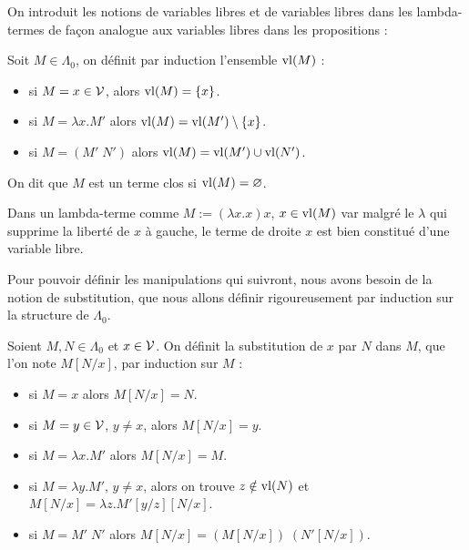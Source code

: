 On introduit les notions de variables libres et de variables libres dans les lambda-termes de façon analogue aux variables libres dans les propositions :

\begin{defi}
    Soit $M\in\Lambda_0$, on définit par induction l'ensemble $\mathrm{vl}(M)$ :
    \begin{itemize}[label=$\bullet$]
        \item si $M = x \in \mathcal V$, alors $\mathrm{vl}(M) = \{x\}$.
        \item si $M = \lambda x.M'$ alors $\mathrm{vl}(M) = \mathrm{vl}(M')\setminus \{x\}$.
        \item si $M = (M'\;N')$ alors $\mathrm{vl}(M) = \mathrm{vl}(M')\cup \mathrm{vl}(N')$.
    \end{itemize}

    On dit que $M$ est un terme clos si $\mathrm{vl}(M) = \varnothing$.
\end{defi}

\begin{rmk}
    Dans un lambda-terme comme $M := (\lambda x.x)x$, $x\in\mathrm{vl}(M)$ var malgré le $\lambda$ qui supprime la liberté de $x$ à gauche, le terme de droite $x$ est bien constitué d'une variable libre.
\end{rmk}

Pour pouvoir définir les manipulations qui suivront, nous avons besoin de la notion de substitution, que nous allons définir rigoureusement par induction sur la structure de $\Lambda_0$.

\begin{defi}[Substitution]
    Soient $M,N\in\Lambda_0$ et $x\in\mathcal V$. On définit la substitution de $x$ par $N$ dans $M$, que l'on note $M[N/x]$, par induction sur $M$ :
    \begin{itemize}[label=$\bullet$]
        \item si $M = x$ alors $M[N/x] = N$.
        \item si $M = y\in\mathcal V$, $y\neq x$, alors $M[N/x] = y$.
        \item si $M = \lambda x.M'$ alors $M[N/x] = M$.
        \item si $M = \lambda y.M'$, $y\neq x$, alors on trouve $z\notin\mathrm{vl}(N)$ et $M[N/x] = \lambda z. M'[y/z][N/x]$.
        \item si $M = M'\;N'$ alors $M[N/x] = (M[N/x])\;(N'[N/x])$.
    \end{itemize}
\end{defi}

